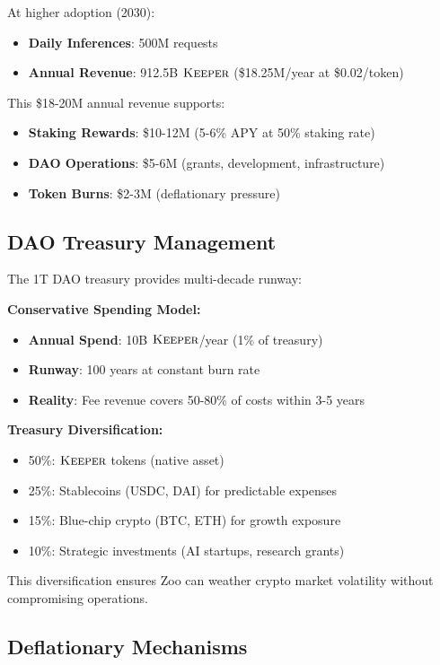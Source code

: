 \documentclass[11pt,letterpaper]{article}
\theoremstyle{definition}
\theoremstyle{remark}
\newcommand{\KEEPER}{\textsc{Keeper}}
\begin{document}
At higher adoption (2030):
\begin{itemize}
\item \textbf{Daily Inferences}: 500M requests
\item \textbf{Annual Revenue}: 912.5B $\KEEPER$ (\$18.25M/year at \$0.02/token)
\end{itemize}

This \$18-20M annual revenue supports:
\begin{itemize}
\item \textbf{Staking Rewards}: \$10-12M (5-6\% APY at 50\% staking rate)
\item \textbf{DAO Operations}: \$5-6M (grants, development, infrastructure)
\item \textbf{Token Burns}: \$2-3M (deflationary pressure)
\end{itemize}

\subsection{DAO Treasury Management}

The 1T DAO treasury provides multi-decade runway:

\textbf{Conservative Spending Model:}
\begin{itemize}
\item \textbf{Annual Spend}: 10B $\KEEPER$/year (1\% of treasury)
\item \textbf{Runway}: 100 years at constant burn rate
\item \textbf{Reality}: Fee revenue covers 50-80\% of costs within 3-5 years
\end{itemize}

\textbf{Treasury Diversification:}
\begin{itemize}
\item 50\%: $\KEEPER$ tokens (native asset)
\item 25\%: Stablecoins (USDC, DAI) for predictable expenses
\item 15\%: Blue-chip crypto (BTC, ETH) for growth exposure
\item 10\%: Strategic investments (AI startups, research grants)
\end{itemize}

This diversification ensures Zoo can weather crypto market volatility without compromising operations.

\subsection{Deflationary Mechanisms}
\end{document}
